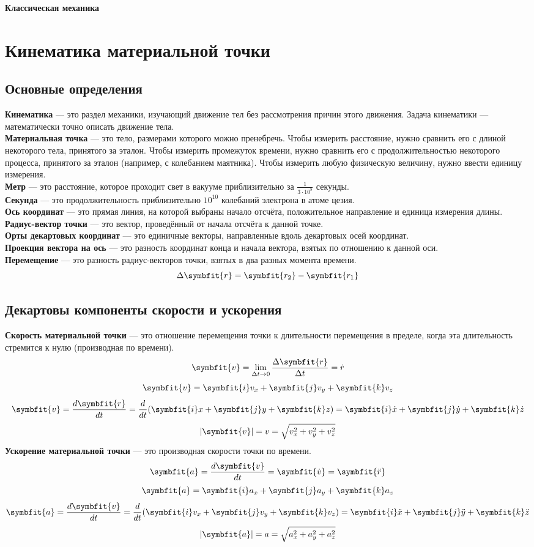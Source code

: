 \documentclass[fleqn,a4paper,12pt,titlepage,finall]{article}
\newcommand\vv[1]{\symbfit{#1}}
\begin{document}
{\huge \bf \centering Классическая механика \par}
\tableofcontents
\section{Кинематика материальной точки}
\subsection{Основные определения}
{\bf Кинематика} --- это раздел механики, изучающий движение тел без рассмотрения
причин этого движения. Задача кинематики --- математически точно описать
движение тела. \\
{\bf Материальная точка} --- это тело, размерами которого можно пренебречь.
Чтобы измерить расстояние, нужно сравнить его с длиной некоторого тела,
принятого за эталон. Чтобы измерить промежуток времени, нужно сравнить его с
продолжительностью некоторого процесса, принятого за эталон (например, с
колебанием маятника). Чтобы измерить любую физическую величину, нужно ввести
единицу измерения. \\
{\bf Метр} --- это расстояние, которое проходит свет в вакууме приблизительно за
$\frac{1}{3\cdot 10^8}$ секунды. \\
{\bf Секунда} --- это продолжительность приблизительно $10^{10}$ колебаний
электрона в атоме цезия.  \\
{\bf Ось координат} --- это прямая линия, на которой выбраны начало отсчёта,
положительное направление и единица измерения длины. \\
{\bf Радиус-вектор точки} --- это вектор, проведённый от начала отсчёта к данной
точке. \\
{\bf Орты декартовых координат} --- это единичные векторы, направленные вдоль
декартовых осей координат. \\
{\bf Проекция вектора на ось} --- это разность координат конца и начала вектора,
взятых по отношению к данной оси. \\
{\bf Перемещение} --- это разность радиус-векторов точки, взятых в два разных
момента времени.
\[\Delta \vv{r} = \vv{r_2} - \vv{r_1}\]
\subsection{Декартовы компоненты скорости и ускорения}
{\bf Скорость материальной точки} --- это отношение перемещения точки к длительности
перемещения в пределе, когда эта длительность стремится к нулю (производная по
времени).
\[\vv{v} = \lim_{\Delta t \to 0} \frac{\Delta \vv{r}}{\Delta t}	= \dot{r}\]
\[\vv{v} = \vv{i}v_x + \vv{j}v_y + \vv{k}v_z\]
\[\vv{v} = \frac{d\vv{r}}{dt} = \frac{d}{dt}(\vv{i}x+\vv{j}y+\vv{k}z) =
\vv{i}\dot{x} + \vv{j}\dot{y} + \vv{k}\dot{z}\]
\[|\vv{v}| = v = \sqrt{v_x^2 + v_y^2 + v_z^2}\]
{\bf Ускорение материальной точки} --- это производная скорости точки по времени.
\[\vv{a} = \frac{d\vv{v}}{dt} = \vv{\dot{v}} = \vv{\ddot{r}}\]
\[\vv{a} = \vv{i}a_x + \vv{j}a_y + \vv{k}a_z\]
\[\vv{a} = \frac{d\vv{v}}{dt} = \frac{d}{dt}(\vv{i}v_x+\vv{j}v_y+\vv{k}v_z) =
\vv{i}\ddot{x} + \vv{j}\ddot{y} + \vv{k}\ddot{z}\]
\[|\vv{a}| = a = \sqrt{a_x^2 + a_y^2 + a_z^2}\]
\end{document}
